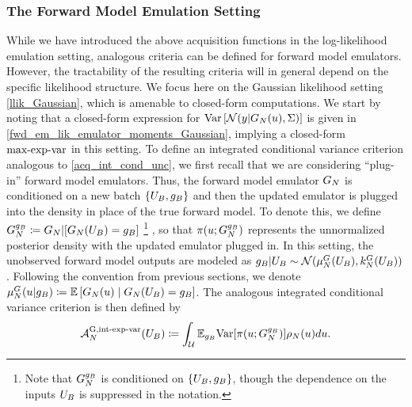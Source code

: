 \documentclass[12pt]{article}
\begin{document}
\subsubsection{The Forward Model Emulation Setting}
While we have introduced the above acquisition functions in the log-likelihood emulation setting, analogous 
criteria can be defined for forward model emulators. However, the tractability of the resulting criteria will in 
general depend on the specific likelihood structure. We focus here on the Gaussian likelihood setting 
\ref{llik_Gaussian}, which is amenable to closed-form computations. We start by noting that a closed-form
expression for $\Var\left[\Gaussian(\obs| \fwdEm[\Ndesign](\Par), \likPar) \right]$ is given in
\ref{fwd_em_lik_emulator_moments_Gaussian}, implying a closed-form $\maxexpvarLabel$ 
in this setting. To define an integrated conditional variance criterion analogous to 
\ref{acq_int_cond_unc}, we first recall that we are considering ``plug-in'' forward model emulators. 
Thus, the forward model emulator $\fwdEm$ is conditioned on a new batch 
$\{\designBatchIn, \designBatchFwd\}$ and then the updated emulator is plugged into the density 
in place of the true forward model. 
To denote this, we define 
$\fwdEmCond{\designBatchFwd} \Def \fwdEm | [\fwdEm(\designBatchIn) = \designBatchFwd]$
\footnote{Note that $\fwdEmCond{\designBatchFwd}$ is conditioned on $\{\designBatchIn, \designBatchFwd\}$, though the 
dependence on the inputs $\designBatchIn$ is suppressed in the notation.}
, so that 
$\postDens(\Par; \fwdEmCond{\designBatchFwd})$ represents the unnormalized posterior density 
with the updated emulator plugged in.  
In this setting, the unobserved forward model outputs are modeled 
as $\designBatchFwd|\designBatchIn \sim \Gaussian(\emMean{\fwd}(\designBatchIn), \emKer{\fwd}(\designBatchIn))$.
Following the convention from previous sections, we denote 
$\emMean[\Ndesign]{\fwd}(\Par | \designBatchFwd) \Def \E\left[\fwdEm(\Par) \given \fwdEm(\designBatchIn) = \designBatchFwd\right]$.
The analogous integrated conditional variance criterion is then defined by 
\begin{equation}
\labelAcq[\Ndesign]{\fwdintExpVarLabel}(\designBatchIn) \Def
\int_{\parSpace} \E_{\designBatchFwd} \Var[\postDens(\Par; \fwdEmCond{\designBatchFwd})]\weightDens(\Par) d\Par. \label{fwd-int-exp-var}
\end{equation}
\end{document}
